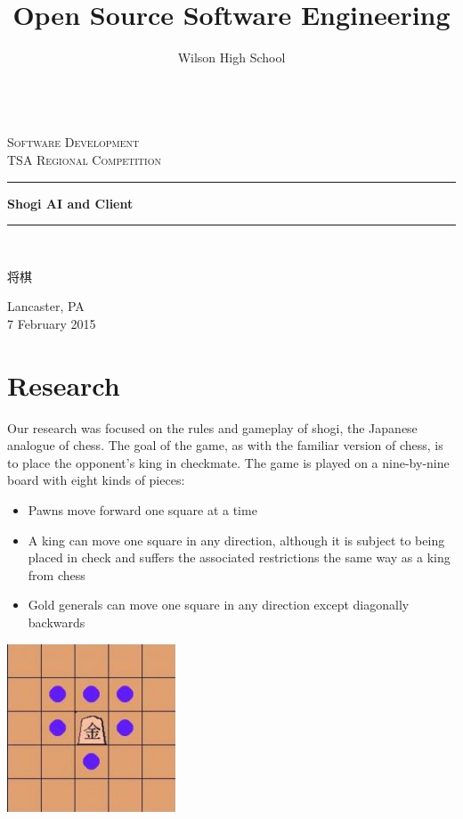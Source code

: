 \documentclass[letterpaper,12pt]{article}
\title{Open Source Software Engineering}
\author{Wilson High School}
\begin{document}
\begin{titlepage}
\begin{center}
 ~\\[1cm]
 \textsc{\LARGE Software Development}\\[1.5cm]
 \textsc{\Large TSA Regional Competition}\\[0.5cm]
 \rule{\linewidth}{0.5mm}
 {\huge \bfseries Shogi AI and Client \\[0.4cm]}
 \rule{\linewidth}{0.5mm}\\[0.5cm]
 \begin{CJK}{UTF8}{gbsn}
 {\huge 将棋}
 \end{CJK}
 \vfill
 {\large Lancaster, PA \\[0.4cm]}
 {\large 7 February 2015}
\end{center}
\end{titlepage}

\tableofcontents

\pagebreak

\section{Research}

Our research was focused on the rules and gameplay of shogi, the Japanese analogue of chess. The goal of the game, as with the familiar version of chess, is to place the opponent's king in checkmate. The game is played on a nine-by-nine board with eight kinds of pieces:

\begin{itemize}
 \item Pawns move forward one square at a time
 \item A king can move one square in any direction, although it is subject to being placed in check and suffers the associated restrictions the same way as a king from chess 
 \item Gold generals can move one square in any direction except diagonally backwards
 \end{itemize}

 \begin{center}
  \includegraphics[width=5cm]{img/goldMove.jpg}
 \end{center}
 
\end{document}
